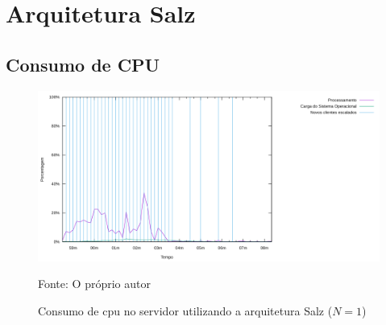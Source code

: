 \section{Arquitetura Salz}
\label{sec:arc_salz}

\subsection{Consumo de CPU}

\begin{figure}[htb!]
  \caption{Consumo de \ac{cpu} no servidor utilizando a arquitetura Salz ($N=1$)}
  \label{fig:salz_t2_cpu}
  \includegraphics[width=\textwidth]{metricas_salz_t2/cpu.png}
  \centering
  
  Fonte: O próprio autor
\end{figure}


